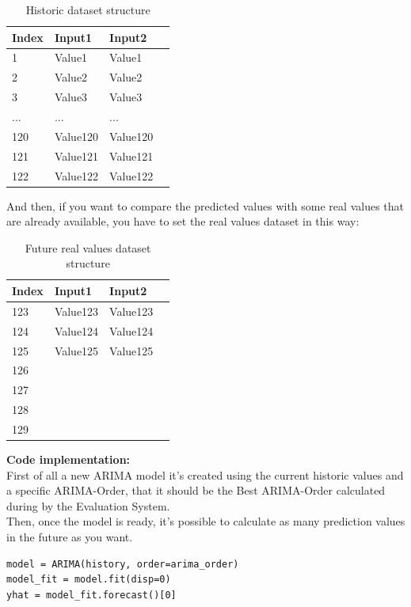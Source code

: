 \begin{table}[ht] 
    \centering 
    \begin{tabular}{ | l | l | l | p{5cm} |}
        \hline
        Index 	& Input1 	& Input2			\\ \hline
          	1 	& Value1 	& Value1			\\ \hline
          	2 	& Value2 	& Value2			\\ \hline
          	3 	& Value3	& Value3 		\\ \hline
          	... & ... 		& ...				\\ \hline
           	120 & Value120 & Value120	\\ \hline
          	121 & Value121 & Value121	\\ \hline
 			122 & Value122 & Value122	\\ \hline
    \end{tabular}
    \caption{Historic dataset structure}
    \label{table: pred_historic_values} 
\end{table} 

And then, if you want to compare the predicted values with some real values that are already available, you have to set the real values dataset in this way:


\begin{table}[ht] 
    \centering 
    \begin{tabular}{ | l | l | l | p{5cm} |}
        \hline
        Index & Input1 & Input2 		\\ \hline
          	123 & Value123 & Value123 	\\ \hline
          	124 & Value124 & Value124 	\\ \hline
          	125 & Value125 & Value125 	\\ \hline
          	126 & 	&					\\ \hline
          	127 & 	&					\\ \hline
          	128 & 	&					\\ \hline
 			129 & 	&					\\ \hline
    \end{tabular}
    \caption{Future real values dataset structure}
    \label{table: pred_real_values} 
\end{table} 

\newpage
\textbf{Code implementation:}\\
First of all a new ARIMA model it's created using the current historic values and a specific ARIMA-Order, that it should be the Best ARIMA-Order calculated during by the Evaluation System.\\
Then, once the model is ready, it's possible to calculate as many prediction values in the future as you want. \\
\begin{lstlisting}
model = ARIMA(history, order=arima_order)
model_fit = model.fit(disp=0)
yhat = model_fit.forecast()[0]
\end{lstlisting}

